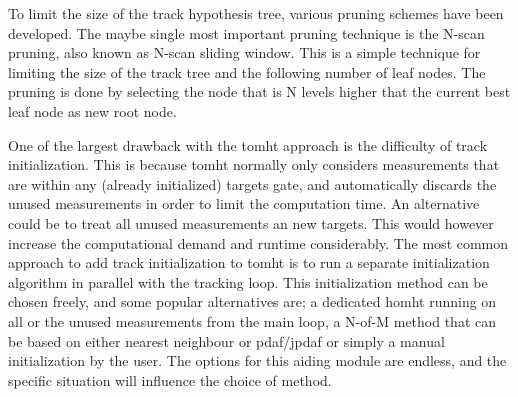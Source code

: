To limit the size of the \gls{track hypothesis tree}, various pruning schemes have been developed. The maybe single most important pruning technique is the N-scan pruning, also known as N-scan sliding window. This is a simple technique for limiting the size of the track tree and the following number of leaf nodes. The pruning is done by selecting the node that is N levels higher that the current best leaf node as new root node.

One of the largest drawback with the \gls{tomht} approach is the difficulty of track initialization. This is because \gls{tomht} normally only considers \glspl{measurement} that are within any (already initialized) \glspl{target} \gls{gate}, and automatically discards the unused \glspl{measurement} in order to limit the computation time. An alternative could be to treat all unused measurements an new targets. This would however increase the computational demand and runtime considerably. The most common approach to add track initialization to \gls{tomht} is to run a separate initialization algorithm in parallel with the tracking loop. This initialization method can be chosen freely, and some popular alternatives are; a dedicated \gls{homht} running on all or the unused \glspl{measurement} from the main loop, a N-of-M method that can be based on either nearest neighbour or \gls{pdaf}/\gls{jpdaf} or simply a manual initialization by the user. The options for this aiding module are endless, and the specific situation will influence the choice of method.